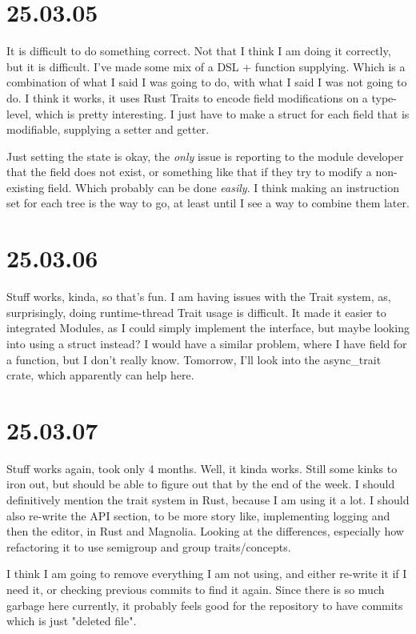 \section{25.03.05}

It is difficult to do something correct. Not that I think I am doing it
correctly, but it is difficult. I've made some mix of a DSL + function
supplying. Which is a combination of what I said I was going to do, with what I
said I was not going to do. I think it works, it uses Rust Traits to encode
field modifications on a type-level, which is pretty interesting. I just have to
make a struct for each field that is modifiable, supplying a setter and getter.

Just setting the state is okay, the \textit{only} issue is reporting to
the module developer that the field does not exist, or something like that if
they try to modify a non-existing field. Which probably can be done
\textit{easily}. I think making an instruction set for each tree is the way to
go, at least until I see a way to combine them later.

\section{25.03.06}

Stuff works, kinda, so that's fun. I am having issues with the Trait system, as,
surprisingly, doing runtime-thread Trait usage is difficult. It made it easier
to integrated Modules, as I could simply implement the interface, but maybe
looking into using a struct instead? I would have a similar problem, where I
have field for a function, but I don't really know. Tomorrow, I'll look into
the async_trait crate, which apparently can help here.

\section{25.03.07}

Stuff works again, took only 4 months. Well, it kinda works. Still some kinks to
iron out, but should be able to figure out that by the end of the week. I should
definitively mention the trait system in Rust, because I am using it a lot. I
should also re-write the API section, to be more story like, implementing
logging and then the editor, in Rust and Magnolia. Looking at the differences,
especially how refactoring it to use semigroup and group traits/concepts.

I think I am going to remove everything I am not using, and either re-write it
if I need it, or checking previous commits to find it again. Since there is so
much garbage here currently, it probably feels good for the repository to have
commits which is just "deleted file".
